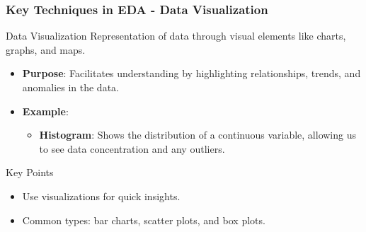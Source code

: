 \documentclass{beamer}
\begin{document}
\begin{frame}[fragile]
    \frametitle{Key Techniques in EDA - Data Visualization}
    
    \begin{block}{Data Visualization}
        Representation of data through visual elements like charts, graphs, and maps.
    \end{block}
    
    \begin{itemize}
        \item \textbf{Purpose}: Facilitates understanding by highlighting relationships, trends, and anomalies in the data.
        
        \item \textbf{Example}:
            \begin{itemize}
                \item \textbf{Histogram}: Shows the distribution of a continuous variable, allowing us to see data concentration and any outliers.
            \end{itemize}
    \end{itemize}
    
    \begin{block}{Key Points}
        \begin{itemize}
            \item Use visualizations for quick insights.
            \item Common types: bar charts, scatter plots, and box plots.
        \end{itemize}
    \end{block}
\end{frame}
\end{document}
